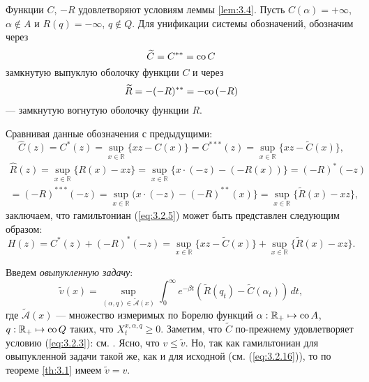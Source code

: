 Функции $C$, $-R$ удовлетворяют условиям леммы \ref{lem:3.4}. Пусть $C(\alpha)=+\infty$, $\alpha\not\in A$ и $R(q)=-\infty$, $q\not\in Q$. Для унификации системы обозначений, обозначим через
$$\widetilde C=C^{**}={\rm co\,} C$$
замкнутую выпуклую оболочку функции $C$ и через
$$\widetilde R=-(-R)^{**}=-{\rm co\,}(-R)$$
--- замкнутую вогнутую оболочку функции $R$.

Сравнивая данные обозначения с предыдущими:
$$\widehat C(z)=C^*(z)=\sup_{x\in\mathbb R}\{xz-C(x)\}=C^{***}(z)=\sup_{x\in\mathbb R}\{xz-\widetilde C(x)\},$$
\begin{align} \label{eq:3.2.15}
\widehat R(z)=\sup_{x\in\mathbb R}\{R(x)-xz\}=\sup_{x\in\mathbb R}\{x\cdot (-z)-(-R(x))\}=(-R)^*(-z)\nonumber\\
=(-R)^{***}(-z)=\sup_{x\in\mathbb R}(x\cdot (-z)-(-R)^{**}(x)\}=\sup_{x\in\mathbb R}\{\widetilde R(x)-xz\},
\end{align}
заключаем, что гамильтониан (\ref{eq:3.2.5}) может быть представлен следующим образом:
\begin{equation} \label{eq:3.2.16}
 H(z)=C^*(z)+(-R)^*(-z)=\sup_{x\in\mathbb R}\{xz-\widetilde C(x)\}+\sup_{x\in\mathbb R}\{\widetilde R(x)-xz\}.
\end{equation}

Введем \emph{овыпукленную задачу}:
\begin{equation} \label{eq:3.2.17}
\widetilde v(x)=\sup_{(\alpha,q)\in\widetilde{\mathscr A}(x)}\int_0^\infty e^{-\beta t}(\widetilde R(q_t)-\widetilde C(\alpha_t))\,dt,
\end{equation}
где $\widetilde{\mathscr A}(x)$ --- множество измеримых по Борелю функций $\alpha:\mathbb R_+\mapsto{\rm co\,} A$, $q:\mathbb R_+\mapsto {\rm co\,} Q$ таких, что $X_t^{x,\alpha,q}\ge 0$. Заметим, что $\widetilde C$ по-прежнему удовлетворяет условию (\ref{eq:3.2.3}): см. \cite[глава E, предложение 1.3.9(ii)]{HirUrrLem01}. Ясно, что $v\le\widetilde v$. Но, так как гамильтониан для овыпукленной задачи такой же, как и для исходной (см. (\ref{eq:3.2.16})), то по теореме \ref{th:3.1} имеем $\widetilde v=v$.

